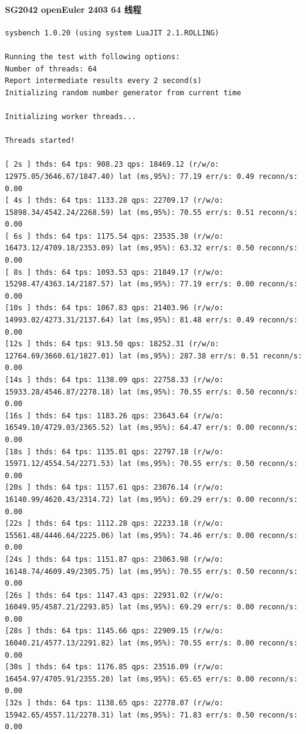 \documentclass{article}
\begin{document}
\paragraph{SG2042 openEuler 2403 64 线程}

\begin{verbatim}
sysbench 1.0.20 (using system LuaJIT 2.1.ROLLING)

Running the test with following options:
Number of threads: 64
Report intermediate results every 2 second(s)
Initializing random number generator from current time

Initializing worker threads...

Threads started!

[ 2s ] thds: 64 tps: 908.23 qps: 18469.12 (r/w/o: 12975.05/3646.67/1847.40) lat (ms,95%): 77.19 err/s: 0.49 reconn/s: 0.00
[ 4s ] thds: 64 tps: 1133.28 qps: 22709.17 (r/w/o: 15898.34/4542.24/2268.59) lat (ms,95%): 70.55 err/s: 0.51 reconn/s: 0.00
[ 6s ] thds: 64 tps: 1175.54 qps: 23535.38 (r/w/o: 16473.12/4709.18/2353.09) lat (ms,95%): 63.32 err/s: 0.50 reconn/s: 0.00
[ 8s ] thds: 64 tps: 1093.53 qps: 21849.17 (r/w/o: 15298.47/4363.14/2187.57) lat (ms,95%): 77.19 err/s: 0.00 reconn/s: 0.00
[10s ] thds: 64 tps: 1067.83 qps: 21403.96 (r/w/o: 14993.02/4273.31/2137.64) lat (ms,95%): 81.48 err/s: 0.49 reconn/s: 0.00
[12s ] thds: 64 tps: 913.50 qps: 18252.31 (r/w/o: 12764.69/3660.61/1827.01) lat (ms,95%): 287.38 err/s: 0.51 reconn/s: 0.00
[14s ] thds: 64 tps: 1138.09 qps: 22758.33 (r/w/o: 15933.28/4546.87/2278.18) lat (ms,95%): 70.55 err/s: 0.50 reconn/s: 0.00
[16s ] thds: 64 tps: 1183.26 qps: 23643.64 (r/w/o: 16549.10/4729.03/2365.52) lat (ms,95%): 64.47 err/s: 0.00 reconn/s: 0.00
[18s ] thds: 64 tps: 1135.01 qps: 22797.18 (r/w/o: 15971.12/4554.54/2271.53) lat (ms,95%): 70.55 err/s: 0.50 reconn/s: 0.00
[20s ] thds: 64 tps: 1157.61 qps: 23076.14 (r/w/o: 16140.99/4620.43/2314.72) lat (ms,95%): 69.29 err/s: 0.00 reconn/s: 0.00
[22s ] thds: 64 tps: 1112.28 qps: 22233.18 (r/w/o: 15561.48/4446.64/2225.06) lat (ms,95%): 74.46 err/s: 0.00 reconn/s: 0.00
[24s ] thds: 64 tps: 1151.87 qps: 23063.98 (r/w/o: 16148.74/4609.49/2305.75) lat (ms,95%): 70.55 err/s: 0.50 reconn/s: 0.00
[26s ] thds: 64 tps: 1147.43 qps: 22931.02 (r/w/o: 16049.95/4587.21/2293.85) lat (ms,95%): 69.29 err/s: 0.00 reconn/s: 0.00
[28s ] thds: 64 tps: 1145.66 qps: 22909.15 (r/w/o: 16040.21/4577.13/2291.82) lat (ms,95%): 70.55 err/s: 0.00 reconn/s: 0.00
[30s ] thds: 64 tps: 1176.85 qps: 23516.09 (r/w/o: 16454.97/4705.91/2355.20) lat (ms,95%): 65.65 err/s: 0.00 reconn/s: 0.00
[32s ] thds: 64 tps: 1138.65 qps: 22778.07 (r/w/o: 15942.65/4557.11/2278.31) lat (ms,95%): 71.83 err/s: 0.50 reconn/s: 0.00

\end{verbatim}
\end{document}

